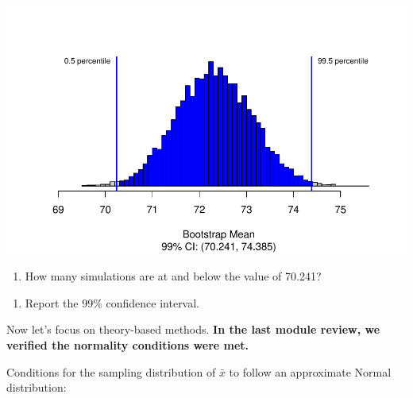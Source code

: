 \documentclass[
]{report}
\providecommand{\tightlist}{%
  \setlength{\itemsep}{0pt}\setlength{\parskip}{0pt}}
\begin{document}
\begin{center}\includegraphics[width=0.7\linewidth]{10-UR-module7_review_files/figure-latex/unnamed-chunk-3-1} \end{center}

\begin{enumerate}
\def\labelenumi{\arabic{enumi}.}
\setcounter{enumi}{2}
\tightlist
\item
  How many simulations are at and below the value of 70.241?
\end{enumerate}

\vspace{1in}

\begin{enumerate}
\def\labelenumi{\arabic{enumi}.}
\setcounter{enumi}{3}
\tightlist
\item
  Report the 99\% confidence interval.
\end{enumerate}

\vspace{1in}

Now let's focus on theory-based methods. \textbf{In the last module review, we verified the normality conditions were met.}

Conditions for the sampling distribution of \(\bar{x}\) to follow an approximate Normal distribution:
\end{document}
